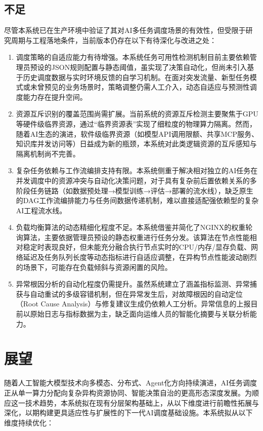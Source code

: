 \subsection{不足}

尽管本系统已在生产环境中验证了其对AI多任务调度场景的有效性，但受限于研究周期与工程落地条件，当前版本仍存在以下有待深化与改进之处：

\begin{enumerate}
    \item 调度策略的自适应能力有待增强。本系统任务可用性检测机制目前主要依赖管理员预设的JSON规则配置与静态阈值，虽实现了决策自动化，但尚未引入基于历史调度数据与实时环境反馈的自学习机制。在面对突发流量、新型任务模式或未曾预见的业务场景时，策略调整仍需人工介入，动态自适应与预测性调度能力存在提升空间。
    \item 资源互斥识别的覆盖范围尚需扩展。当前系统的资源互斥检测主要聚焦于GPU等硬件级临界资源，通过“临界资源表”实现了细粒度的物理算力隔离。然而，随着AI生态的演进，软件级临界资源（如模型API调用限额、共享MCP服务、知识库并发访问等）日益成为新的瓶颈，本系统对此类逻辑资源的互斥感知与隔离机制尚不完善。
    \item 复杂任务依赖与工作流编排支持有限。本系统侧重于解决相对独立的AI任务在并发调度中的资源冲突与自动化决策问题，对于具有复杂前后置依赖关系的多阶段任务链路（如数据预处理→模型训练→评估→部署的流水线），缺乏原生的DAG工作流编排能力与任务间数据传递机制，难以直接适配强依赖型的复杂AI工程流水线。
    \item 负载均衡算法的动态精细化程度不足。本系统借鉴并简化了NGINX的权重轮询算法，主要依据管理员预设的静态权重进行任务分发。该算法在节点性能相对稳定时表现良好，但未能充分融合执行节点实时的CPU/内存/显存负载、网络延迟及任务队列长度等动态指标进行自适应调整，在异构节点性能波动剧烈的场景下，可能存在负载倾斜与资源闲置的风险。
    \item 异常根因分析的自动化程度仍需提升。虽然系统建立了涵盖指标监测、异常捕获与自动重试的多级容错机制，但在异常发生后，对故障根因的自动定位（Root Cause Analysis）与修复建议生成仍依赖人工分析。异常信息的上报目前以原始日志与指标数据为主，缺乏面向运维人员的智能化摘要与关联分析能力。
\end{enumerate}

\section{展望}

随着人工智能大模型技术向多模态、分布式、Agent化方向持续演进，AI任务调度正从单一算力分配向复杂异构资源协同、智能决策自治的更高形态深度发展。为顺应这一技术趋势，本系统拟在现有分层架构基础上，从以下维度进行前瞻性拓展与深化，以期构建更具适应性与扩展性的下一代AI调度基础设施。本系统拟从以下维度持续优化：

